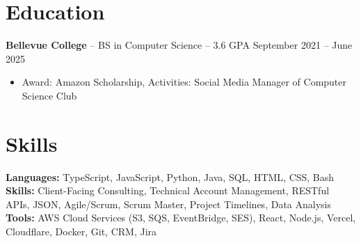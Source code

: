 \documentclass[11pt]{article}       %
\begin{document}

\vspace{-18.5pt}

\section*{Education}
\textbf{Bellevue College} -- BS in Computer Science -- 3.6 GPA \hfill September 2021 -- June 2025\\
\vspace{-9pt}
\begin{itemize}
  \item Award: Amazon Scholarship, Activities: Social Media Manager of Computer Science Club
\end{itemize}

\vspace{-18.5pt}

\section*{Skills}
\textbf{Languages:} TypeScript, JavaScript, Python, Java, SQL, HTML, CSS, Bash \\
\textbf{Skills:} Client-Facing Consulting, Technical Account Management, RESTful APIs, JSON, Agile/Scrum, Scrum Master, Project Timelines, Data Analysis \\
\textbf{Tools:} AWS Cloud Services (S3, SQS, EventBridge, SES), React, Node.js, Vercel, Cloudflare, Docker, Git, CRM, Jira \\

\vspace{-6.5pt}
\end{document}
